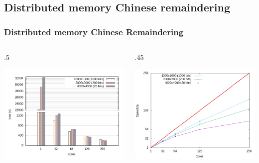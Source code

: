 \documentclass{beamer}
\begin{document}
\subsection{Distributed memory Chinese remaindering}
\begin{frame}
  \frametitle{Distributed memory Chinese Remaindering}

      \begin{columns}
      \begin{column} {.5\textwidth}
        \begin{center}
          \includegraphics[width=\textwidth]{nodes_histogram}
      \end{center}
      \end{column}
      \begin{column} {.45\textwidth}
        \begin{center}
          \includegraphics[width=\textwidth]{nodes_SPEEDUP}

\end{center}
\end{column}
\end{columns}
\end{frame}
\end{document}
